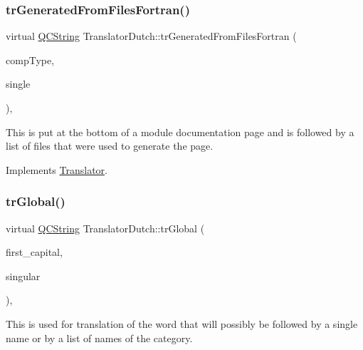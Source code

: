\mbox{\label{class_translator_dutch_a55f64a625262ae9b478a5cb7047231b2}} 
\subsubsection{\texorpdfstring{trGeneratedFromFilesFortran()}{trGeneratedFromFilesFortran()}}
{\footnotesize\ttfamily virtual \mbox{\hyperlink{class_q_c_string}{Q\+C\+String}} Translator\+Dutch\+::tr\+Generated\+From\+Files\+Fortran (\begin{DoxyParamCaption}\item[{\mbox{\hyperlink{class_class_def_ae70cf86d35fe954a94c566fbcfc87939}{Class\+Def\+::\+Compound\+Type}}}]{comp\+Type,  }\item[{bool}]{single }\end{DoxyParamCaption})\hspace{0.3cm}{\ttfamily [inline]}, {\ttfamily [virtual]}}

This is put at the bottom of a module documentation page and is followed by a list of files that were used to generate the page. 

Implements \mbox{\hyperlink{class_translator}{Translator}}.

\mbox{\label{class_translator_dutch_a84677edea3afc4551b0ac3a00b6283e6}} 
\subsubsection{\texorpdfstring{trGlobal()}{trGlobal()}}
{\footnotesize\ttfamily virtual \mbox{\hyperlink{class_q_c_string}{Q\+C\+String}} Translator\+Dutch\+::tr\+Global (\begin{DoxyParamCaption}\item[{bool}]{first\+\_\+capital,  }\item[{bool}]{singular }\end{DoxyParamCaption})\hspace{0.3cm}{\ttfamily [inline]}, {\ttfamily [virtual]}}

This is used for translation of the word that will possibly be followed by a single name or by a list of names of the category. 


